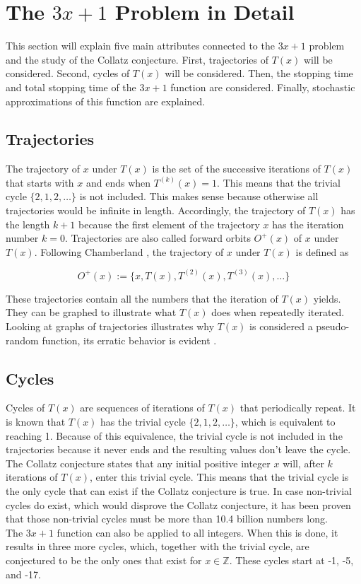 \documentclass[12pt,a4paper,reqno]{amsart}
\begin{document}
\section{The $3x+1$ Problem in Detail}

This section will explain five main attributes connected to the $3x+1$ problem
and the study of the Collatz conjecture. First, trajectories of $T(x)$ will be
considered. Second, cycles of $T(x)$ will be considered. Then, the stopping
time and total stopping time of the $3x+1$ function are considered. Finally,
stochastic approximations of this function are explained.

\subsection{Trajectories}

The trajectory of $x$ under $T(x)$ is the set of the successive iterations of 
$T(x)$ that starts with $x$ and ends when $T^{(k)}(x)=1$. This means that the
trivial cycle $\{2,1,2,\dots\}$ is not included. This makes sense because
otherwise all trajectories would be infinite in length. Accordingly, the 
trajectory of $T(x)$ has the length $k+1$ because the first element of the 
trajectory $x$ has the iteration number $k=0$. Trajectories are also called 
forward orbits $O^+(x)$ of $x$ under $T(x)$. Following Chamberland
\cite{src:02}, the trajectory of $x$ under $T(x)$ is defined as 

\begin{equation}
    \nonumber
    O^+(x):=\{x, T(x), T^{(2)}(x), T^{(3)}(x),\dots\}
\end{equation}

These trajectories contain all the numbers that the iteration of $T(x)$ yields. 
They can be graphed to illustrate what $T(x)$ does when repeatedly iterated. 
Looking at graphs of trajectories illustrates why $T(x)$ is considered
a pseudo-random function, its erratic behavior is evident \cite{src:03}.

\subsection{Cycles}

Cycles of $T(x)$ are sequences of iterations of $T(x)$ that periodically 
repeat. It is known that $T(x)$ has the trivial cycle $\{2,1,2,\dots\}$, which 
is equivalent to reaching 1. Because of this equivalence, the trivial cycle is
not included in the trajectories because it never ends and the resulting values
don't leave the cycle. The Collatz conjecture states that any initial positive 
integer $x$ will, after $k$ iterations of $T(x)$, enter this trivial cycle. 
This means that the trivial cycle is the only cycle that can exist if the
Collatz conjecture is true.
In case non-trivial cycles do exist, which would disprove the Collatz
conjecture, it has been proven that those non-trivial cycles must be more than 
10.4 billion numbers long. \\
The $3x+1$ function can also be applied to all integers. When this is done, it
results in three more cycles, which, together with the trivial cycle, are 
conjectured to be the only ones that exist for $x \in \mathbb{Z}$. These 
cycles start at -1, -5, and -17.
\end{document}
